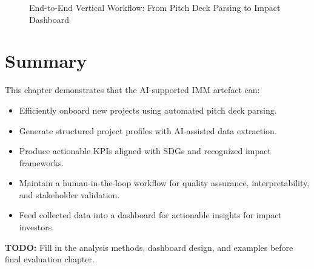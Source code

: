 \begin{figure}[H]
\centering
{}
\caption{End-to-End Vertical Workflow: From Pitch Deck Parsing to Impact Dashboard}
\label{fig:end-to-end-pipeline-vertical}
\end{figure}

\section{Summary}\label{sec:artefact-summary}

This chapter demonstrates that the AI-supported IMM artefact can:

\begin{itemize}
    \item Efficiently onboard new projects using automated pitch deck parsing.
    \item Generate structured project profiles with AI-assisted data extraction.
    \item Produce actionable KPIs aligned with SDGs and recognized impact frameworks.
    \item Maintain a human-in-the-loop workflow for quality assurance, interpretability, and stakeholder validation.
    \item Feed collected data into a dashboard for actionable insights for impact investors.
\end{itemize}

\textbf{TODO:} Fill in the analysis methods, dashboard design, and examples before final evaluation chapter.